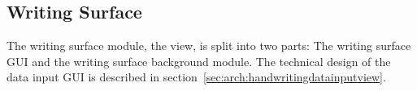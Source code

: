 %  
%  
%
%
%
% 
%

\subsection{Writing Surface} %
\label{sec:hwre:writingsurface}

The writing surface module, the view, is split into two parts: The writing 
surface GUI and the writing surface background module. The technical design of 
the data input GUI is described in 
section~\ref{sec:arch:handwritingdatainputview}.

